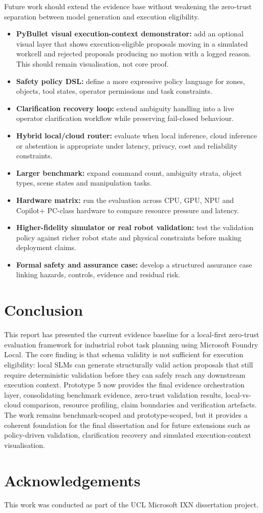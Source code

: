 \documentclass[sigconf,nonacm]{acmart}
\begin{document}
Future work should extend the evidence base without weakening the zero-trust separation between model generation and execution eligibility.

\begin{itemize}
    \item \textbf{PyBullet visual execution-context demonstrator:} add an optional visual layer that shows execution-eligible proposals moving in a simulated workcell and rejected proposals producing no motion with a logged reason. This should remain visualisation, not core proof.
    \item \textbf{Safety policy DSL:} define a more expressive policy language for zones, objects, tool states, operator permissions and task constraints.
    \item \textbf{Clarification recovery loop:} extend ambiguity handling into a live operator clarification workflow while preserving fail-closed behaviour.
    \item \textbf{Hybrid local/cloud router:} evaluate when local inference, cloud inference or abstention is appropriate under latency, privacy, cost and reliability constraints.
    \item \textbf{Larger benchmark:} expand command count, ambiguity strata, object types, scene states and manipulation tasks.
    \item \textbf{Hardware matrix:} run the evaluation across CPU, GPU, NPU and Copilot+ PC-class hardware to compare resource pressure and latency.
    \item \textbf{Higher-fidelity simulator or real robot validation:} test the validation policy against richer robot state and physical constraints before making deployment claims.
    \item \textbf{Formal safety and assurance case:} develop a structured assurance case linking hazards, controls, evidence and residual risk.
\end{itemize}

\section{Conclusion}

This report has presented the current evidence baseline for a local-first zero-trust evaluation framework for industrial robot task planning using Microsoft Foundry Local. The core finding is that schema validity is not sufficient for execution eligibility: local SLMs can generate structurally valid action proposals that still require deterministic validation before they can safely reach any downstream execution context. Prototype 5 now provides the final evidence orchestration layer, consolidating benchmark evidence, zero-trust validation results, local-vs-cloud comparison, resource profiling, claim boundaries and verification artefacts. The work remains benchmark-scoped and prototype-scoped, but it provides a coherent foundation for the final dissertation and for future extensions such as policy-driven validation, clarification recovery and simulated execution-context visualisation.

\section*{Acknowledgements}
This work was conducted as part of the UCL Microsoft IXN dissertation project.





\end{document}
